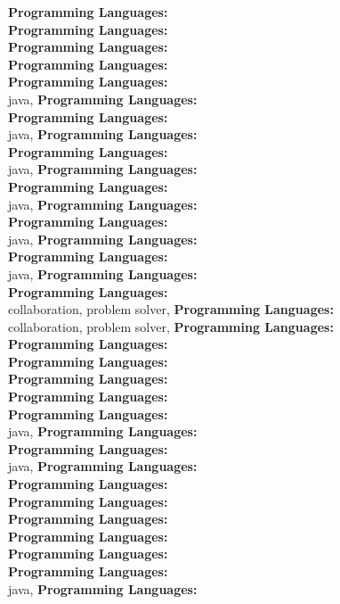 \textbf{Programming Languages:} \\
\textbf{Programming Languages:} \\
\textbf{Programming Languages:} \\
\textbf{Programming Languages:} \\
\textbf{Programming Languages:} \\
java, \textbf{Programming Languages:} \\
\textbf{Programming Languages:} \\
java, \textbf{Programming Languages:} \\
\textbf{Programming Languages:} \\
java, \textbf{Programming Languages:} \\
\textbf{Programming Languages:} \\
java, \textbf{Programming Languages:} \\
\textbf{Programming Languages:} \\
java, \textbf{Programming Languages:} \\
\textbf{Programming Languages:} \\
java, \textbf{Programming Languages:} \\
\textbf{Programming Languages:} \\
collaboration, problem solver, \textbf{Programming Languages:} \\
collaboration, problem solver, \textbf{Programming Languages:} \\
\textbf{Programming Languages:} \\
\textbf{Programming Languages:} \\
\textbf{Programming Languages:} \\
\textbf{Programming Languages:} \\
\textbf{Programming Languages:} \\
java, \textbf{Programming Languages:} \\
\textbf{Programming Languages:} \\
java, \textbf{Programming Languages:} \\
\textbf{Programming Languages:} \\
\textbf{Programming Languages:} \\
\textbf{Programming Languages:} \\
\textbf{Programming Languages:} \\
\textbf{Programming Languages:} \\
\textbf{Programming Languages:} \\
java, \textbf{Programming Languages:} \\
